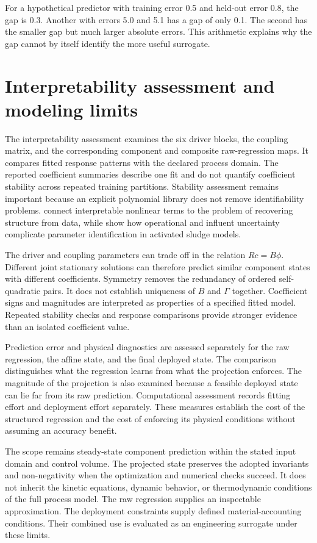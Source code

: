 For a hypothetical predictor with training error 0.5 and held-out error 0.8, the gap is 0.3. Another with errors 5.0 and 5.1 has a gap of only 0.1. The second has the smaller gap but much larger absolute errors. This arithmetic explains why the gap cannot by itself identify the more useful surrogate.

\section{Interpretability assessment and modeling limits}

The interpretability assessment examines the six driver blocks, the coupling matrix, and the corresponding component and composite raw-regression maps. It compares fitted response patterns with the declared process domain. The reported coefficient summaries describe one fit and do not quantify coefficient stability across repeated training partitions. Stability assessment remains important because an explicit polynomial library does not remove identifiability problems. \citet{Brunton2016} connect interpretable nonlinear terms to the problem of recovering structure from data, while \citet{Machado2014} show how operational and influent uncertainty complicate parameter identification in activated sludge models.

The driver and coupling parameters can trade off in the relation \(Rc=B\phi\). Different joint stationary solutions can therefore predict similar component states with different coefficients. Symmetry removes the redundancy of ordered self-quadratic pairs. It does not establish uniqueness of \(B\) and \(\Gamma\) together. Coefficient signs and magnitudes are interpreted as properties of a specified fitted model. Repeated stability checks and response comparisons provide stronger evidence than an isolated coefficient value.

Prediction error and physical diagnostics are assessed separately for the raw regression, the affine state, and the final deployed state. The comparison distinguishes what the regression learns from what the projection enforces. The magnitude of the projection is also examined because a feasible deployed state can lie far from its raw prediction. Computational assessment records fitting effort and deployment effort separately. These measures establish the cost of the structured regression and the cost of enforcing its physical conditions without assuming an accuracy benefit.

The scope remains steady-state component prediction within the stated input domain and control volume. The projected state preserves the adopted invariants and non-negativity when the optimization and numerical checks succeed. It does not inherit the kinetic equations, dynamic behavior, or thermodynamic conditions of the full process model. The raw regression supplies an inspectable approximation. The deployment constraints supply defined material-accounting conditions. Their combined use is evaluated as an engineering surrogate under these limits.

